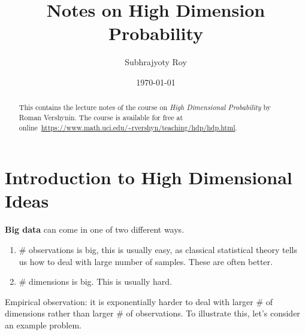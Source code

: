 \documentclass[12pt]{article}
\title{Notes on High Dimension Probability}
\author{Subhrajyoty Roy}
\date{\today}
\begin{document}
\allowdisplaybreaks
\maketitle

\begin{abstract}
    This contains the lecture notes of the course on \textit{High Dimensional Probability} by Roman Vershynin. The course is available for free at online~\url{https://www.math.uci.edu/~rvershyn/teaching/hdp/hdp.html}.
\end{abstract}

\tableofcontents


\section{Introduction to High Dimensional Ideas}

\textbf{Big data} can come in one of two different ways.
\begin{enumerate}
	\item \# observations is big, this is usually easy, as classical statistical theory tells us how to deal with large number of samples. These are often better.
	\item \# dimensions is big. This is usually hard.
\end{enumerate}

Empirical observation: it is exponentially harder to deal with larger \# of dimensions rather than larger \# of observations. To illustrate this, let's consider an example problem.
\end{document}
